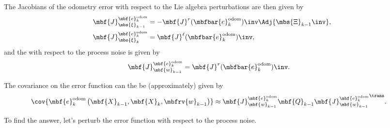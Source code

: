 \documentclass[ nobib, nofonts, notoc]{tufte-handout}
\begin{document}
    The Jacobians of the odometry error with respect to the Lie algebra perturbations are then given by
    \begin{align}
        \mbf{J}
            ^{\mbf{e}
                ^{\mathrm{odom}}
                _{k}}
            _{\mbs{\xi}_{k-1}}
        &=
        -\mbf{J}^{r}(\mbfbar{e}^{\mathrm{odom}}_{k})\inv
        \Adj{\mbs{\Xi}_{k-1}\inv}
        , \\
        \mbf{J}
            ^{\mbf{e}
                ^{\mathrm{odom}}
                _{k}}
            _{\mbs{\xi}_{k}}
        &=
        \mbf{J}^{\ell}(\mbfbar{e}^{\mathrm{odom}}_{k})\inv,
    \end{align}
    and the with respect to the process noise is given by
    \begin{align}
        \mbf{J}
            ^{\mbf{e}
                ^{\mathrm{odom}}
                _{k}}
            _{\mbf{w}_{k-1}}
        &=
        \mbf{J}^{r}(\mbfbar{e}^{\mathrm{odom}}_{k})\inv.
    \end{align}

    The covariance on the error function can the be (approximately) given by
    \begin{align}
        \cov{
            \mbf{e}
              ^{\mathrm{odom}}
              _{k}
            \left(
              \mbf{X}_{k-1},
              \mbf{X}_{k},
              \mbfrv{w}_{k-1}
            \right)
        }
        &\approx
        \mbf{J}
            ^{\mbf{e}
                ^{\mathrm{odom}}
                _{k}}
            _{\mbf{w}_{k-1}}
        \mbf{Q}_{k-1}
        {
        \mbf{J}
            ^{\mbf{e}
                ^{\mathrm{odom}}
                _{k}}
            _{\mbf{w}_{k-1}}
        }^{\trans}.
    \end{align}

    To find the answer, let's perturb the error function with respect to the process noise.
\end{document}
